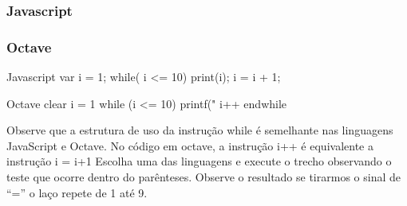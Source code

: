 \subsubsection{Javascript}
\subsubsection{Octave}



Javascript
var i = 1;
while( i <= 10){
  print(i);
  i = i + 1;
}

Octave
clear
i = 1
while (i <= 10)
  printf(" %
  i++
endwhile

Observe que a estrutura de uso da instrução while é semelhante nas linguagens JavaScript e Octave. No código em octave, a instrução i++ é equivalente a instrução i = i+1 
Escolha uma das linguagens e execute o trecho observando o teste que ocorre dentro do parênteses. Observe o resultado se tirarmos o sinal de “=” o laço repete de 1 até 9.
